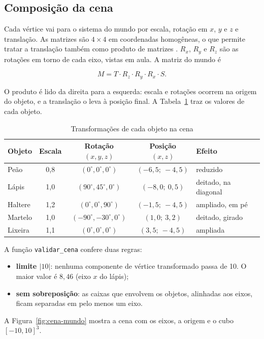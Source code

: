 \subsection{Composição da cena}\label{sec:cena}

Cada vértice vai para o sistema do mundo por escala, rotação em $x$, $y$ e $z$ e translação. As
matrizes são $4 \times 4$ em coordenadas homogêneas, o que permite tratar a translação também como
produto de matrizes \cite{azevedo2018}. $R_x$, $R_y$ e $R_z$ são as rotações em torno de cada eixo,
vistas em aula. A matriz do mundo é

\begin{equation}
  M = T \cdot R_z \cdot R_y \cdot R_x \cdot S .
\end{equation}

O produto é lido da direita para a esquerda: escala e rotações ocorrem na origem do objeto, e a
translação o leva à posição final. A Tabela~\ref{tab:cena} traz os valores de cada objeto.

\begin{table}[H]
  \centering
  \caption{Transformações de cada objeto na cena}\label{tab:cena}
  \begin{tabular}{lcccl}
    \toprule
    Objeto & Escala & Rotação $(x, y, z)$ & Posição $(x, z)$ & Efeito \\
    \midrule
    Peão    & 0,8 & $(0^\circ, 0^\circ, 0^\circ)$     & $(-6{,}5;\ -4{,}5)$ & reduzido \\
    Lápis   & 1,0 & $(90^\circ, 45^\circ, 0^\circ)$   & $(-8{,}0;\ 0{,}5)$  & deitado, na diagonal \\
    Haltere & 1,2 & $(0^\circ, 0^\circ, 90^\circ)$    & $(-1{,}5;\ -4{,}5)$ & ampliado, em pé \\
    Martelo & 1,0 & $(-90^\circ, -30^\circ, 0^\circ)$ & $(1{,}0;\ 3{,}2)$   & deitado, girado \\
    Lixeira & 1,1 & $(0^\circ, 0^\circ, 0^\circ)$     & $(3{,}5;\ -4{,}5)$  & ampliada \\
    \bottomrule
  \end{tabular}
\end{table}

A função \texttt{validar\_cena} confere duas regras:

\begin{itemize}
  \item \textbf{limite $|10|$}: nenhuma componente de vértice transformado passa de 10. O maior
        valor é $8{,}46$ (eixo $x$ do lápis);
  \item \textbf{sem sobreposição}: as caixas que envolvem os objetos, alinhadas aos eixos, ficam
        separadas em pelo menos um eixo.
\end{itemize}

A Figura~\ref{fig:cena-mundo} mostra a cena com os eixos, a origem e o cubo $[-10, 10]^3$.

